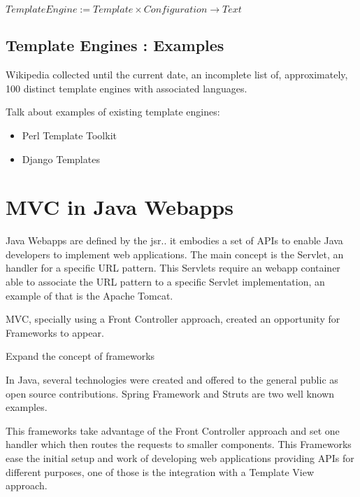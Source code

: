 \begin{center}
    $TemplateEngine := Template \times Configuration \rightarrow Text$
\end{center}

\subsection{Template Engines : Examples}

Wikipedia collected \cite{WikipediaComparisonEngines} until the current date, an incomplete list of, approximately, 100 distinct template engines with associated languages.

\begin{expand}
    Talk about examples of existing template engines:
    
    \begin{itemize}
        \item Perl Template Toolkit \cite{Chamberlain2003PerlToolkit}
        \item Django Templates \cite{Newman2008DjangoMore} 
    \end{itemize}
\end{expand}


\section{MVC in Java Webapps}

Java Webapps are defined by the jsr.. it embodies a set of APIs to enable Java developers to implement web applications. The main concept is the Servlet, an handler for a specific URL pattern. This Servlets require an webapp container able to associate the URL pattern to a specific Servlet implementation, an example of that is the Apache Tomcat. 

MVC, specially using a Front Controller approach, created an opportunity for Frameworks to appear. 

\begin{expand}
    Expand the concept of frameworks \cite{Liu1996SmalltalkDesign}
\end{expand}

In Java, several technologies were created and offered to the general public as open source contributions. Spring Framework and Struts are two well known examples.

This frameworks take advantage of the Front Controller approach and set one handler which then routes the requests to smaller components. This Frameworks ease the initial setup and work of developing web applications providing APIs for different purposes, one of those is the integration with a Template View approach.

